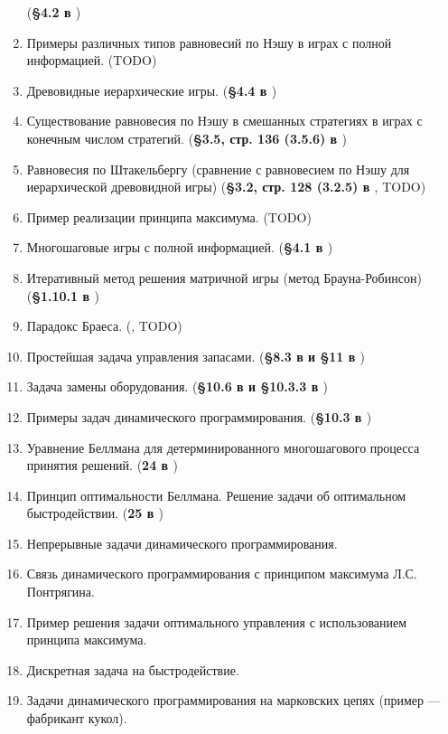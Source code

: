 \documentclass[a4paper,14pt]{extarticle}
\begin{document}
\begin{enumerate}
        (\textbf{\S 4.2 в \cite{gametheory-2012}})
    \item Примеры различных типов равновесий по Нэшу в играх с полной информацией.
        (TODO)
    \item Древовидные иерархические игры.
        (\textbf{\S 4.4 в \cite{gametheory-2012}})
    \item Существование равновесия по Нэшу в смешанных стратегиях в играх с конечным числом стратегий.
        (\textbf{\S 3.5, стр. 136 (3.5.6) в \cite{gametheory-2012}})
    \item Равновесия по Штакельбергу (сравнение с равновесием по Нэшу для иерархической древовидной игры)
        (\textbf{\S 3.2, стр. 128 (3.2.5) в \cite{gametheory-2012}}, TODO)
    \item Пример реализации принципа максимума.
        (TODO)
    \item Многошаговые игры с полной информацией.
        (\textbf{\S 4.1 в \cite{gametheory-2012}})
    \item Итеративный метод решения матричной игры (метод Брауна-Робинсон)
        (\textbf{\S 1.10.1 в \cite{gametheory-2012}})
    \item Парадокс Браеса.
        (\textbf{\cite{wiki-braess-ru}}, TODO) %
    \item Простейшая задача управления запасами.
        (\textbf{\S 8.3 в \cite{vagner-2-1983} и \S 11 в \cite{taha-2002}})
    \item Задача замены оборудования.
        (\textbf{\S 10.6 в \cite{vagner-2-1983} и \S 10.3.3 в \cite{taha-2002}})
    \item Примеры задач динамического программирования.
        (\textbf{\S 10.3 в \cite{taha-2002}})
    \item Уравнение Беллмана для детерминированного многошагового процесса принятия решений.
        (\textbf{24 в \cite{sharshukov-xyz}})
    \item Принцип оптимальности Беллмана. Решение задачи об оптимальном быстродействии.
        (\textbf{25 в \cite{sharshukov-xyz}})
    \item Непрерывные задачи динамического программирования.
    \item Связь динамического программирования с принципом максимума Л.С. Понтрягина.
    \item Пример решения задачи оптимального управления с использованием принципа максимума.
    \item Дискретная задача на быстродействие.
    \item Задачи динамического программирования на марковских цепях (пример --- фабрикант кукол).
\end{enumerate}

\custombibliography
\end{document}
